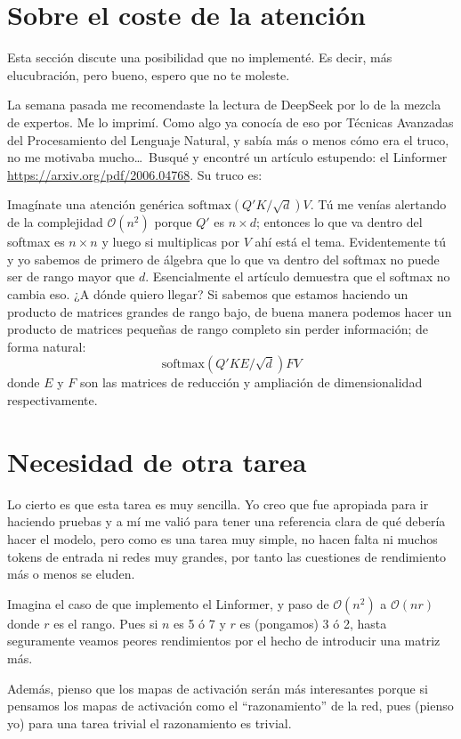 \documentclass[a4paper,12pt]{article}
\begin{document}
\section{Sobre el coste de la atención}

Esta sección discute una posibilidad que no implementé. Es decir, más elucubración, pero bueno, espero que no te moleste.

La semana pasada me recomendaste la lectura de DeepSeek por lo de la mezcla de expertos. Me lo imprimí. Como algo ya conocía de eso por Técnicas Avanzadas del Procesamiento del Lenguaje Natural, y sabía más o menos cómo era el truco, no me motivaba mucho\ldots\ Busqué y encontré un artículo estupendo: el Linformer \url{https://arxiv.org/pdf/2006.04768}. Su truco es:

Imagínate una atención genérica $\text{softmax}(Q'K/\sqrt{d})V$. Tú me venías alertando de la complejidad $\mathcal{O}(n^2)$ porque $Q'$ es $n \times d$; entonces lo que va dentro del softmax es $n \times n$ y luego si multiplicas por $V$ ahí está el tema. Evidentemente tú y yo sabemos de primero de álgebra que lo que va dentro del softmax no puede ser de rango mayor que $d$. Esencialmente el artículo demuestra que el softmax no cambia eso. ¿A dónde quiero llegar? Si sabemos que estamos haciendo un producto de matrices grandes de rango bajo, de buena manera podemos hacer un producto de matrices pequeñas de rango completo sin perder información; de forma natural:
\[
    \text{softmax}(Q'KE/\sqrt{d})FV
\]
donde $E$ y $F$ son las matrices de reducción y ampliación de dimensionalidad respectivamente.


\section{Necesidad de otra tarea}

Lo cierto es que esta tarea es muy sencilla. Yo creo que fue apropiada para ir haciendo pruebas y a mí me valió para tener una referencia clara de qué debería hacer el modelo, pero como es una tarea muy simple, no hacen falta ni muchos tokens de entrada ni redes muy grandes, por tanto las cuestiones de rendimiento más o menos se eluden.

Imagina el caso de que implemento el Linformer, y paso de $\mathcal{O}(n^2)$ a $\mathcal{O}(nr)$ donde $r$ es el rango. Pues si $n$ es 5 ó 7 y $r$ es (pongamos) 3 ó 2, hasta seguramente veamos peores rendimientos por el hecho de introducir una matriz más.

Además, pienso que los mapas de activación serán más interesantes porque si pensamos los mapas de activación como el ``razonamiento'' de la red, pues (pienso yo) para una tarea trivial el razonamiento es trivial.
\end{document}
